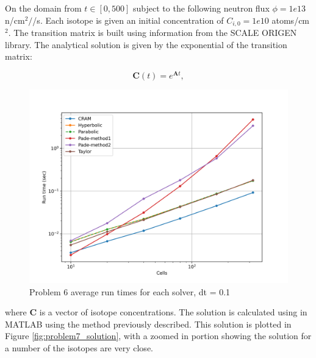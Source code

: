 \noindent On the domain from $t \in [0, 500]$ subject to the following neutron flux $\phi = 1e13$ n/cm$^2/$/s. Each isotope is given an initial concentration of $C_{i, 0} = 1e10$ atoms/cm$^2$. The transition matrix is built using information from the SCALE ORIGEN library. The analytical solution is given by the exponential of the transition matrix:

\begin{equation}
   \boldsymbol{C}(t) = e^{\boldsymbol{A}t}, 
\end{equation}

\clearpage

\begin{figure}[p]
    \centering
    \includegraphics[width=6in]{images/chapter-5/progressionProblems/problem6/problem6Runtimes.png}
    \caption{Problem 6 average run times for each solver, dt = 0.1}
    \label{fig:problem6_runtimes}
\end{figure}

\clearpage

\noindent where $\boldsymbol{C}$ is a vector of isotope concentrations. The solution is calculated using in MATLAB using the method previously described. This solution is plotted in Figure \ref{fig:problem7_solution}, with a zoomed in portion showing the solution for a number of the isotopes are very close. 


